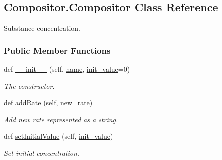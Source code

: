 \hypertarget{classCompositor_1_1Compositor}{}\subsection{Compositor.\+Compositor Class Reference}
\label{classCompositor_1_1Compositor}


Substance concentration.  


\subsubsection*{Public Member Functions}
\begin{DoxyCompactItemize}
\item 
def \hyperlink{classCompositor_1_1Compositor_a8fb632191ba53b989002f54ad5227675}{\+\_\+\+\_\+init\+\_\+\+\_\+} (self, \hyperlink{classCompositor_1_1Compositor_a87d9f58151be1502f8a10ffb4cdb8515}{name}, \hyperlink{classCompositor_1_1Compositor_a2f4d70bb0294f38fb00dfa4a43a9accf}{init\+\_\+value}=0)
\begin{DoxyCompactList}\small\item\em The constructor. \end{DoxyCompactList}\item 
def \hyperlink{classCompositor_1_1Compositor_a96c82c9a0422d043372c98aefec65dc5}{add\+Rate} (self, new\+\_\+rate)
\begin{DoxyCompactList}\small\item\em Add new rate represented as a string. \end{DoxyCompactList}\item 
def \hyperlink{classCompositor_1_1Compositor_a549136c8bd578793eedf7a06e04d62c6}{set\+Initial\+Value} (self, \hyperlink{classCompositor_1_1Compositor_a2f4d70bb0294f38fb00dfa4a43a9accf}{init\+\_\+value})
\begin{DoxyCompactList}\small\item\em Set initial concentration. \end{DoxyCompactList}\end{DoxyCompactItemize}
